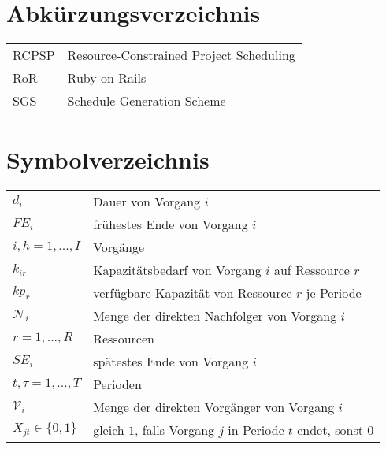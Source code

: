 \documentclass[a4paper,12pt,parskip,bibtotoc,liststotoc]{article}
\begin{document}
\newpage
\section*{Abkürzungsverzeichnis}
\begin{table}[h!]
    \vspace*{-3mm}
    \hspace*{2mm}
  \renewcommand{\arraystretch}{1,5}
    \begin{tabular}{ll}  %
           RCPSP      & Resource-Constrained Project Scheduling \\
           RoR & Ruby on Rails \\
SGS & Schedule Generation Scheme\\
	\end{tabular}
\end{table}
\newpage
\section*{Symbolverzeichnis}
\begin{table}[h!]
    \vspace*{-3mm}
        \hspace*{2mm}
      \renewcommand{\arraystretch}{1,5}
    \begin{tabular}{ll} 
$d_i$ & Dauer von Vorgang $i$ \\
$FE_i$& frühestes Ende von Vorgang $i$\\
$i,h=1,...,I$ & Vorgänge \\
$k_{ir}$& Kapazitätsbedarf von Vorgang $i$ auf Ressource $r$\\
$kp_r$ & verfügbare Kapazität von Ressource $r$ je Periode\\
$\mathcal{N}_i$ & Menge der direkten Nachfolger von Vorgang $i$ \\
$r=1,...,R$ & Ressourcen \\
$SE_i$& spätestes Ende von Vorgang $i$\\
$t,\tau=1,..., T$ & Perioden\\
$\mathcal{V}_i$ & Menge der direkten Vorgänger von Vorgang $i$ \\
$X_{jt}\in\{0,1\}$ & gleich $1$, falls Vorgang $j$ in Periode $t$ endet, sonst $0$
  	\end{tabular}
\end{table}
\newpage
{}   %
\end{document}
